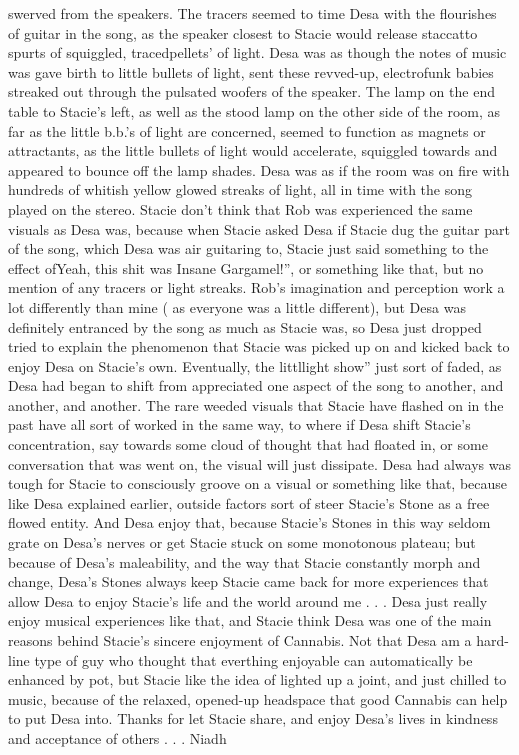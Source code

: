 \documentclass[12pt]{book}
\begin{document}
swerved from the speakers. The tracers seemed to time Desa with the flourishes of guitar in the song, as the speaker closest to Stacie would release staccatto spurts of squiggled, tracedpellets' of light. Desa was as though the notes of music was gave birth to little bullets of light, sent these revved-up, electrofunk babies streaked out through the pulsated woofers of the speaker. The lamp on the end table to Stacie's left, as well as the stood lamp on the other side of the room, as far as the little b.b.'s of light are concerned, seemed to function as magnets or attractants, as the little bullets of light would accelerate, squiggled towards and appeared to bounce off the lamp shades. Desa was as if the room was on fire with hundreds of whitish yellow glowed streaks of light, all in time with the song played on the stereo. Stacie don't think that Rob was experienced the same visuals as Desa was, because when Stacie asked Desa if Stacie dug the guitar part of the song, which Desa was air guitaring to, Stacie just said something to the effect ofYeah, this shit was Insane Gargamel!'', or something like that, but no mention of any tracers or light streaks. Rob's imagination and perception work a lot differently than mine ( as everyone was a little different), but Desa was definitely entranced by the song as much as Stacie was, so Desa just dropped tried to explain the phenomenon that Stacie was picked up on and kicked back to enjoy Desa on Stacie's own. Eventually, the littllight show'' just sort of faded, as Desa had began to shift from appreciated one aspect of the song to another, and another, and another. The rare weeded visuals that Stacie have flashed on in the past have all sort of worked in the same way, to where if Desa shift Stacie's concentration, say towards some cloud of thought that had floated in, or some conversation that was went on, the visual will just dissipate. Desa had always was tough for Stacie to consciously groove on a visual or something like that, because like Desa explained earlier, outside factors sort of steer Stacie's Stone as a free flowed entity. And Desa enjoy that, because Stacie's Stones in this way seldom grate on Desa's nerves or get Stacie stuck on some monotonous plateau; but because of Desa's maleability, and the way that Stacie constantly morph and change, Desa's Stones always keep Stacie came back for more experiences that allow Desa to enjoy Stacie's life and the world around me . . .  Desa just really enjoy musical experiences like that, and Stacie think Desa was one of the main reasons behind Stacie's sincere enjoyment of Cannabis. Not that Desa am a hard-line type of guy who thought that everthing enjoyable can automatically be enhanced by pot, but Stacie like the idea of lighted up a joint, and just chilled to music, because of the relaxed, opened-up headspace that good Cannabis can help to put Desa into. Thanks for let Stacie share, and enjoy Desa's lives in kindness and acceptance of others . . .  Niadh
\end{document}

